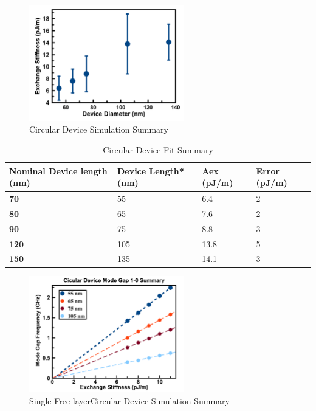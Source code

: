 \begin{figure}[!ht]
  \centering
  \includegraphics[width=0.6\textwidth]{fig/2018/sim/circular_summary}
   \caption{Circular Device Simulation Summary}
  \label{fig:circularsummary}
\end{figure}


\begin{table}[]
\centering
\begin{tabular}{|l|l|l|l|}
\hline
\textbf{Nominal Device length (nm)} & \textbf{Device Length* (nm)} & \textbf{Aex (pJ/m)} & \textbf{Error (pJ/m)} \\ \hline
\textbf{70} & 55 & 6.4 & 2 \\ \hline
\textbf{80} & 65 & 7.6 & 2 \\ \hline
\textbf{90} & 75 & 8.8 & 3 \\ \hline
\textbf{120} & 105 & 13.8 & 5 \\ \hline
\textbf{150} & 135 & 14.1 & 3 \\ \hline
\end{tabular}
\caption{Circular Device Fit Summary}
\label{cirexsummary}
\end{table}


\begin{figure}[!ht]
  \centering
  \includegraphics[width=0.6\textwidth]{fig/2018/sim/free_only_circular}
   \caption{Single Free layerCircular Device Simulation Summary}
  \label{fig:freecircularsummary}
\end{figure}



